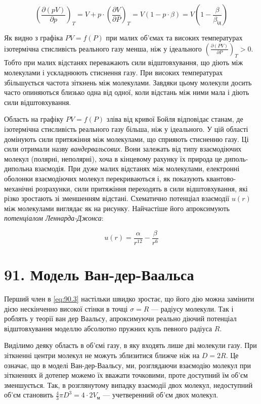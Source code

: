 \documentclass{article}
\begin{document}
\begin{equation}
\left( \frac{\partial(pV)}{\partial p} \right)_{T} = V + p \cdot \left( \frac{\partial V}{\partial P}
\right)_{T} = V(1 - p \cdot \beta) = V\left( 1 - \frac{\beta}{\beta_{ід}} \right)
\label{eq:90.2}
\end{equation}

Як видно з графіка $PV = f(P)$ при малих об'ємах та високих температурах ізотермічна стисливість
реального газу менша, ніж у ідеального $\left(\frac{\partial(PV)}{\partial P}\right)_T > 0$. Тобто при
малих відстанях переважають сили відштовхування, що діють між молекулами і ускладнюють стиснення газу.
При високих температурах збільшується частота зіткнень між молекулами. Завдяки цьому молекули досить
часто опиняються близько одна від одної, коли відстань між ними мала і діють сили відштовхування.

Область на графіку $PV = f(P)$ зліва від кривої Бойля відповідає станам, де ізотермічна стисливість
реального газу більша, ніж у ідеального. У цій області домінують сили притяжіння між молекулами, що
сприяють стисненню газу. Ці сили отримали назву \emph{вандервальсових}. Вони залежать від типу
взаємодіючих молекул (полярні, неполярні), хоча в кінцевому рахунку їх природа це диполь-дипольна
взаємодія. При дуже малих відстанях між молекулами, електронні оболонки взаємодіючих молекул
перекриваються і, як показують квантово-механічні розрахунки, сили притяжіння переходять в сили
відштовхування, які різко зростають зі зменшенням відстані. Схематично потенціал взаємодії $u(r)$ між
молекулами виглядає як на рисунку. Найчастіше його апроксимують \emph{потенціалом Леннарда-Джонса}:

\begin{equation}
u(r) = \frac{\alpha}{r^{12}} - \frac{\beta}{r^{6}}
\label{eq:90.3}
\end{equation}

\section*{91. Модель Ван-дер-Ваальса}

Перший член в \eqref{eq:90.3} настільки швидко зростає, що його дію можна замінити дією нескінченно
високої стінки в точці $\sigma = R$ — радіусу молекули. Так і роблять у теорії ван дер Ваальсу,
апроксимуючи реально діючий потенціал відштовхування моделлю абсолютно пружних куль певного радіуса
$R$.

Виділимо деяку область в об'ємі газу, в яку входять лише дві молекули газу. При зіткненні центри
молекул не можуть зблизитися ближче ніж на $D = 2R$. Це означає, що в моделі Ван-дер-Ваальсу, ми,
розглядаючи взаємодію молекул при зіткненнях й дотепер можемо їх вважати точковими, проте доступний їм
об'єм зменшується. Так, в розглянутому випадку взаємодії двох молекул, недоступний об'єм становить
$\frac{4}{3}\pi D^3 = 4\cdot 2V_{м}$ — учетверенний об'єм двох молекул.
\end{document}
